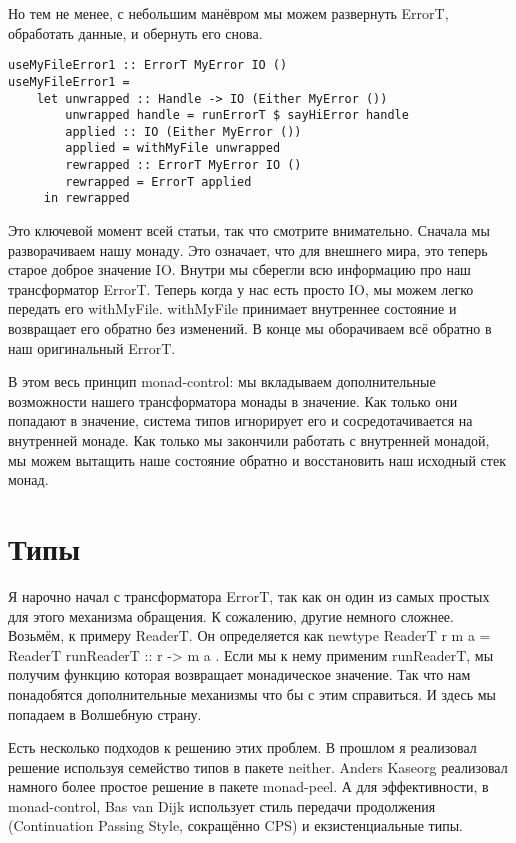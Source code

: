 Но тем не менее, с небольшим манёвром мы можем развернуть ErrorT, обработать данные, и обернуть его снова.

\begin{lstlisting}
useMyFileError1 :: ErrorT MyError IO ()
useMyFileError1 =
    let unwrapped :: Handle -> IO (Either MyError ())
        unwrapped handle = runErrorT $ sayHiError handle
        applied :: IO (Either MyError ())
        applied = withMyFile unwrapped
        rewrapped :: ErrorT MyError IO ()
        rewrapped = ErrorT applied
     in rewrapped
\end{lstlisting}

Это ключевой момент всей статьи, так что смотрите внимательно. Сначала мы разворачиваем нашу монаду. Это означает, что для внешнего мира, это теперь старое доброе значение IO. Внутри мы сберегли всю информацию про наш трансформатор ErrorT. Теперь когда у нас есть просто IO, мы можем легко передать его withMyFile. withMyFile принимает внутреннее состояние и возвращает его обратно без изменений. В конце мы оборачиваем всё обратно в наш оригинальный ErrorT.

В этом весь принцип monad-control: мы вкладываем дополнительные возможности нашего трансформатора монады в значение. Как только они попадают в значение, система типов игнорирует его и сосредотачивается на внутренней монаде. Как только мы закончили работать с внутренней монадой, мы можем вытащить наше состояние обратно и восстановить наш исходный стек монад.

\section{Типы}

Я нарочно начал с трансформатора ErrorT, так как он один из самых простых для этого механизма обращения. К сожалению, другие немного сложнее. Возьмём, к примеру ReaderT. Он определяется как newtype ReaderT r m a = ReaderT { runReaderT :: r -> m a }. Если мы к нему применим runReaderT, мы получим функцию которая возвращает монадическое значение. Так что нам понадобятся дополнительные механизмы что бы с этим справиться. И здесь мы попадаем в Волшебную страну.

Есть несколько подходов к решению этих проблем. В прошлом я реализовал решение используя семейство типов в пакете neither. Anders Kaseorg реализовал намного более простое решение в пакете monad-peel. А для эффективности, в monad-control, Bas van Dijk использует стиль передачи продолжения (Continuation Passing Style, сокращённо CPS) и екзистенциальные типы.

